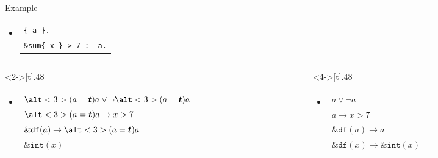 \begin{frame}{Example}
  \medskip
  \begin{itemize}
  \item<1-> 
    \par\smallskip
    \begin{tabular}{l}
      \texttt{\{ a \}.}
      \\
      \texttt{\&sum\{ x \} > 7 :- a.}
    \end{tabular}
  \end{itemize}
  \medskip
  \begin{columns}
    \begin{column}<2->[t]{.48\textwidth}
      \begin{itemize}
      \item<2-> 
        \par\smallskip
        \begin{tabular}[t]{ll}
          {$\alt<3>{(a=\boldsymbol{t})}{a}\vee\neg\alt<3>{(a=\boldsymbol{t})}{a}$}
          \\
          {$\alt<3>{(a=\boldsymbol{t})}{a}\to{x>7}$}
          \\
          $\mathtt{\&df}(a)\to\alt<3>{(a=\boldsymbol{t})}{a}$
          \\
          $\mathtt{\&int}(x)$
        \end{tabular}
      \end{itemize}
    \end{column}
    \begin{column}<4->[t]{.48\textwidth}
      \begin{itemize}
      \item {}
        \par\smallskip
        \begin{tabular}[t]{ll}
          {$a\vee\neg a$}
          \\
          {$a\to{x>7}$}
          \\
          $\mathtt{\&df}(a) \to a$
          \\
          $\mathtt{\&df}(x) \to \mathtt{\&int}(x)$
        \end{tabular}
      \end{itemize}
    \end{column}
  \end{columns}
\end{frame}
%
